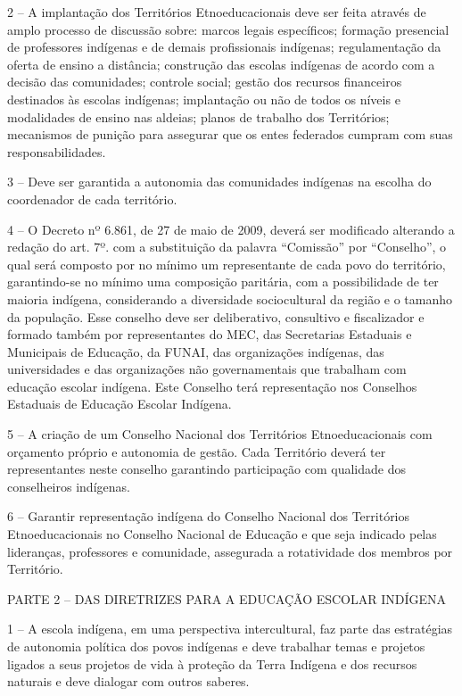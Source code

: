 \documentclass[
]{book}
\begin{document}
2 -- A implantação dos Territórios Etnoeducacionais deve ser feita através de amplo processo de discussão sobre: marcos legais específicos; formação presencial de professores indígenas e de demais profissionais indígenas; regulamentação da oferta de ensino a distância; construção das escolas indígenas de acordo com a decisão das comunidades; controle social; gestão dos recursos financeiros destinados às escolas indígenas; implantação ou não de todos os níveis e modalidades de ensino nas aldeias; planos de trabalho dos Territórios; mecanismos de punição para assegurar que os entes federados cumpram com suas responsabilidades.

3 -- Deve ser garantida a autonomia das comunidades indígenas na escolha do coordenador de cada território.

4 -- O Decreto nº 6.861, de 27 de maio de 2009, deverá ser modificado alterando a redação do art. 7º. com a substituição da palavra ``Comissão'' por ``Conselho'', o qual será composto por no mínimo um representante de cada povo do território, garantindo-se no mínimo uma composição paritária, com a possibilidade de ter maioria indígena, considerando a diversidade sociocultural da região e o tamanho da população. Esse conselho deve ser deliberativo, consultivo e fiscalizador e formado também por representantes do MEC, das Secretarias Estaduais e Municipais de Educação, da FUNAI, das organizações indígenas, das universidades e das organizações não governamentais que trabalham com educação escolar indígena. Este Conselho terá representação nos Conselhos Estaduais de Educação Escolar Indígena.

5 -- A criação de um Conselho Nacional dos Territórios Etnoeducacionais com orçamento próprio e autonomia de gestão. Cada Território deverá ter representantes neste conselho garantindo participação com qualidade dos conselheiros indígenas.

6 -- Garantir representação indígena do Conselho Nacional dos Territórios Etnoeducacionais no Conselho Nacional de Educação e que seja indicado pelas lideranças, professores e comunidade, assegurada a rotatividade dos membros por Território.

PARTE 2 -- DAS DIRETRIZES PARA A EDUCAÇÃO ESCOLAR INDÍGENA

1 -- A escola indígena, em uma perspectiva intercultural, faz parte das estratégias de autonomia política dos povos indígenas e deve trabalhar temas e projetos ligados a seus projetos de vida à proteção da Terra Indígena e dos recursos naturais e deve dialogar com outros saberes.
\end{document}
